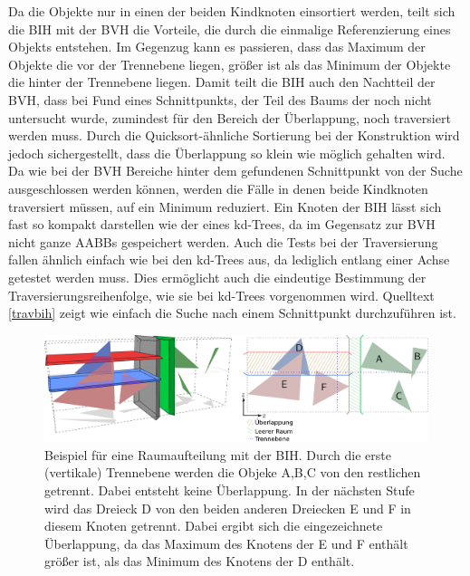 Da die Objekte nur in einen der beiden Kindknoten einsortiert werden, teilt sich die BIH mit der BVH die Vorteile, die durch die einmalige Referenzierung eines Objekts entstehen. Im Gegenzug kann es passieren, dass das Maximum der Objekte die vor der Trennebene liegen, größer ist als das Minimum der Objekte die hinter der Trennebene liegen. Damit teilt die BIH auch den Nachtteil der BVH, dass bei Fund eines Schnittpunkts, der Teil des Baums der noch nicht untersucht wurde, zumindest für den Bereich der Überlappung, noch traversiert werden muss. Durch die Quicksort-ähnliche Sortierung bei der Konstruktion wird jedoch sichergestellt, dass die Überlappung so klein wie möglich gehalten wird. Da wie bei der BVH Bereiche hinter dem gefundenen Schnittpunkt von der Suche ausgeschlossen werden können, werden die Fälle in denen beide Kindknoten traversiert müssen, auf ein Minimum reduziert.
Ein Knoten der BIH lässt sich fast so kompakt darstellen wie der eines kd-Trees, da im Gegensatz zur BVH nicht ganze AABBs gespeichert werden. Auch die Tests bei der Traversierung fallen ähnlich einfach wie bei den kd-Trees aus, da lediglich entlang einer Achse getestet werden muss. Dies ermöglicht auch die eindeutige Bestimmung der Traversierungsreihenfolge, wie sie bei kd-Trees vorgenommen wird. Quelltext \ref{travbih} zeigt wie einfach die Suche nach einem Schnittpunkt durchzuführen ist.

\begin{figure}\centering
\includegraphics[width=1.0\textwidth]{images/bih.pdf} 
\caption[Beispiel für eine Raumaufteilung mit der BIH]{Beispiel für eine Raumaufteilung mit der BIH. Durch die erste (vertikale) Trennebene werden die Objeke A,B,C von den restlichen getrennt. Dabei entsteht keine Überlappung. In der nächsten Stufe wird das Dreieck D von den beiden anderen Dreiecken E und F in diesem Knoten getrennt. Dabei ergibt sich die eingezeichnete Überlappung, da das Maximum des Knotens der E und F enthält größer ist, als das Minimum des Knotens der D enthält.}
\label{fig:bih}
\end{figure}

